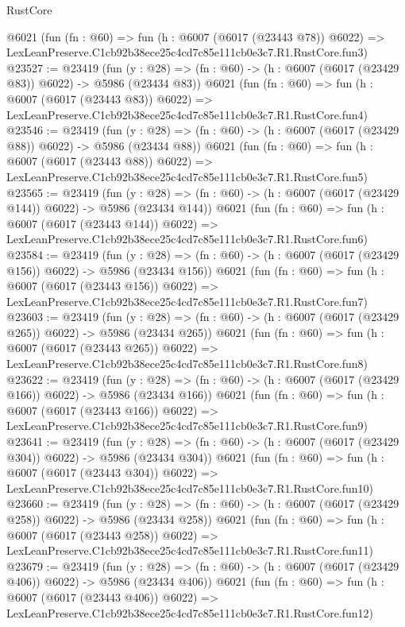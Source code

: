 \begin{lexlean}{RustCore}
\begin{coremodule}
    @6021
    (fun (fn : @60) =>
    fun (h : @6007 (@6017 (@23443 @78)) @6022) =>
    LexLeanPreserve.C1cb92b38ece25c4cd7c85e111cb0e3c7.R1.RustCore.fun3)
@23527 := @23419
    (fun (y : @28) => (fn : @60) -> (h : @6007 (@6017 (@23429 @83)) @6022) -> @5986 (@23434 @83))
    @6021
    (fun (fn : @60) =>
    fun (h : @6007 (@6017 (@23443 @83)) @6022) =>
    LexLeanPreserve.C1cb92b38ece25c4cd7c85e111cb0e3c7.R1.RustCore.fun4)
@23546 := @23419
    (fun (y : @28) => (fn : @60) -> (h : @6007 (@6017 (@23429 @88)) @6022) -> @5986 (@23434 @88))
    @6021
    (fun (fn : @60) =>
    fun (h : @6007 (@6017 (@23443 @88)) @6022) =>
    LexLeanPreserve.C1cb92b38ece25c4cd7c85e111cb0e3c7.R1.RustCore.fun5)
@23565 := @23419
    (fun (y : @28) => (fn : @60) -> (h : @6007 (@6017 (@23429 @144)) @6022) -> @5986 (@23434 @144))
    @6021
    (fun (fn : @60) =>
    fun (h : @6007 (@6017 (@23443 @144)) @6022) =>
    LexLeanPreserve.C1cb92b38ece25c4cd7c85e111cb0e3c7.R1.RustCore.fun6)
@23584 := @23419
    (fun (y : @28) => (fn : @60) -> (h : @6007 (@6017 (@23429 @156)) @6022) -> @5986 (@23434 @156))
    @6021
    (fun (fn : @60) =>
    fun (h : @6007 (@6017 (@23443 @156)) @6022) =>
    LexLeanPreserve.C1cb92b38ece25c4cd7c85e111cb0e3c7.R1.RustCore.fun7)
@23603 := @23419
    (fun (y : @28) => (fn : @60) -> (h : @6007 (@6017 (@23429 @265)) @6022) -> @5986 (@23434 @265))
    @6021
    (fun (fn : @60) =>
    fun (h : @6007 (@6017 (@23443 @265)) @6022) =>
    LexLeanPreserve.C1cb92b38ece25c4cd7c85e111cb0e3c7.R1.RustCore.fun8)
@23622 := @23419
    (fun (y : @28) => (fn : @60) -> (h : @6007 (@6017 (@23429 @166)) @6022) -> @5986 (@23434 @166))
    @6021
    (fun (fn : @60) =>
    fun (h : @6007 (@6017 (@23443 @166)) @6022) =>
    LexLeanPreserve.C1cb92b38ece25c4cd7c85e111cb0e3c7.R1.RustCore.fun9)
@23641 := @23419
    (fun (y : @28) => (fn : @60) -> (h : @6007 (@6017 (@23429 @304)) @6022) -> @5986 (@23434 @304))
    @6021
    (fun (fn : @60) =>
    fun (h : @6007 (@6017 (@23443 @304)) @6022) =>
    LexLeanPreserve.C1cb92b38ece25c4cd7c85e111cb0e3c7.R1.RustCore.fun10)
@23660 := @23419
    (fun (y : @28) => (fn : @60) -> (h : @6007 (@6017 (@23429 @258)) @6022) -> @5986 (@23434 @258))
    @6021
    (fun (fn : @60) =>
    fun (h : @6007 (@6017 (@23443 @258)) @6022) =>
    LexLeanPreserve.C1cb92b38ece25c4cd7c85e111cb0e3c7.R1.RustCore.fun11)
@23679 := @23419
    (fun (y : @28) => (fn : @60) -> (h : @6007 (@6017 (@23429 @406)) @6022) -> @5986 (@23434 @406))
    @6021
    (fun (fn : @60) =>
    fun (h : @6007 (@6017 (@23443 @406)) @6022) =>
    LexLeanPreserve.C1cb92b38ece25c4cd7c85e111cb0e3c7.R1.RustCore.fun12)

\end{coremodule}
\end{lexlean}
